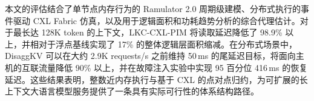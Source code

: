 \documentclass[11pt,a4paper,oneside,fontset=none]{ctexbook}
\begin{document}
本文的评估结合了单节点内存行为的 Ramulator 2.0 周期级建模、分布式执行的事件驱动 CXL Fabric 仿真，以及用于逻辑面积和功耗趋势分析的综合代理估计。对于最长达 128K token 的上下文，LKC-CXL-PIM 将读取延迟降低了 98.9\% 以上，并相对于浮点基线实现了 17\% 的整体逻辑层面积缩减。在分布式场景中，DisaggKV 可以在大约 2.9K requests/s 之前维持 50\,ms 的尾延迟目标，将面向主机的互联流量降低 90\% 以上，并在故障注入实验中实现 95 百分位 416\,ms 的恢复延迟。这些结果表明，整数近内存执行与基于 CXL 的点对点归约，为可扩展的长上下文大语言模型服务提供了一条具有实际可行性的体系结构路径。

\tableofcontents
\listoffigures
\listoftables

\mainmatter











\backmatter


\end{document}
